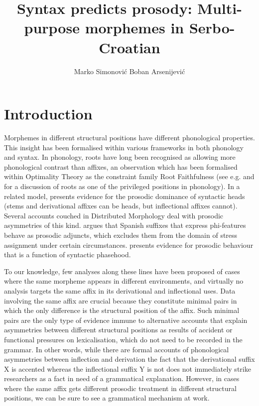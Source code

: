 \documentclass[output=paper]{langsci/langscibook}
\author{Marko Simonović\affiliation{University of Nova Gorica}\orcid{0000-0002-9651-6399}\lastand 
 Boban Arsenijević\affiliation{University of Graz}\orcid{0000-0002-1124-6319}}
\title{Syntax predicts prosody: Multi-purpose morphemes in Serbo-Croatian}
\begin{document}
\maketitle
 

\section{Introduction}\label{sec:simonovic:1}

Morphemes in different structural positions have different phonological properties. This insight has been formalised within various frameworks in both phonology and syntax. In phonology, roots have long been recognised as allowing more phonological contrast than affixes, an observation which has been formalised within Optimality Theory as the constraint family Root Faithfulness (see e.g. \citealt{Mcc1993} and  \citealt{Bec1997} for a discussion of roots as one of the privileged positions in phonology). In a related model, \citet{Revithiadou1999} presents evidence for the prosodic dominance of syntactic heads (stems and derivational affixes can be heads, but inflectional affixes cannot). Several accounts couched in Distributed Morphology \citep{Hal1993,Hal1994} deal with pro\-so\-dic asymmetries of this kind. \citet{Don2017} argues that Spanish suffixes that express phi-features behave as prosodic adjuncts, which excludes them from the domain of stress assignment under certain circumstances. \citet{Mar2002} presents evidence for prosodic behaviour that is a function of syntactic phasehood.

To our knowledge, few analyses along these lines have been proposed of cases where the same morpheme appears in different environments, and virtually no analysis targets the same affix in its derivational and inflectional uses. Data involving the same affix are crucial because they constitute minimal pairs in which the only difference is the structural position of the affix. Such minimal pairs are the only type of evidence immune to alternative accounts that explain asymmetries between different structural positions as results of accident or functional pressures on lexicalisation, which do not need to be recorded in the grammar. In other words, while there are formal accounts of phonological asymmetries between inflection and derivation \citep[e.g.][]{Mcc1993, Bec1997, Revithiadou1999} the fact that the derivational suffix X is accented whereas the inflectional suffix Y is not does not immediately strike researchers as a fact in need of a grammatical explanation. However, in cases where the same affix gets different prosodic treatment in different structural positions, we can be sure to see a grammatical mechanism at work. 
\end{document}
